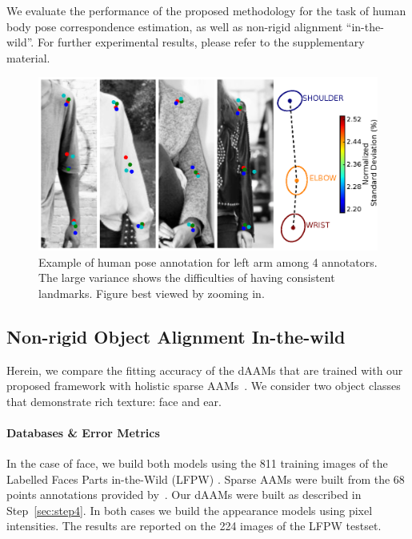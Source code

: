 
We evaluate the performance of the proposed methodology for the task of human body pose correspondence estimation, as well as non-rigid alignment ``in-the-wild''. For further experimental results, please refer to the supplementary material.


\begin{figure}[t!]
    \centering
    \includegraphics[width=\columnwidth]{resources/Fig_Variance/final}
    \caption{Example of human pose annotation for left arm among 4 annotators. The large variance shows the difficulties of having consistent landmarks. Figure best viewed by zooming in.}
    \label{fig:variance}
\end{figure}





\subsection{Non-rigid Object Alignment In-the-wild}
\label{exp:daam_benchmark}
Herein, we compare the fitting accuracy of the dAAMs that are trained with our proposed framework with holistic sparse AAMs~\cite{Cootes2001,Matthews2004}. We consider two object classes that demonstrate rich texture: face and ear.


\paragraph{Databases \& Error Metrics} In the case of face, we build both models using the 811 training images of the Labelled Faces Parts in-the-Wild (LFPW) \cite{belhumeur2013localizing}. Sparse AAMs were built from the 68 points annotations provided by~\cite{sagonas_iccv_300w_2013}. Our dAAMs were built as described in Step~\ref{sec:step4}. In both cases we build the appearance models using pixel intensities. The results are reported on the 224 images of the LFPW testset.


